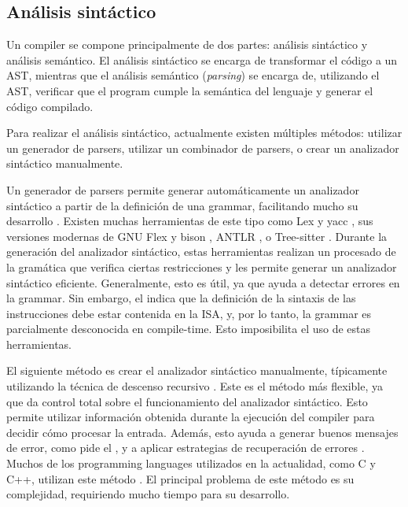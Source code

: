 \subsection{Análisis sintáctico}\label{subsec:parser}

Un \gls{compiler} se compone principalmente de dos partes: análisis sintáctico y
análisis semántico. El análisis sintáctico se encarga de transformar el código a
un \gls{AST}, mientras que el análisis semántico (\textit{parsing}) se encarga
de, utilizando el \gls{AST}, verificar que el \gls{program} cumple la semántica
del lenguaje y generar el código compilado. \parencite{dragon-book}

Para realizar el análisis sintáctico, actualmente existen múltiples métodos:
utilizar un generador de \glspl{parser}, utilizar un combinador de
\glspl{parser}, o crear un analizador sintáctico manualmente.
\parencite{dragon-book} \parencite{parser-combinators}

Un generador de \glspl{parser} permite generar automáticamente un analizador
sintáctico a partir de la definición de una \gls{grammar}, facilitando mucho su
desarrollo \parencite{dragon-book}. Existen muchas herramientas de este tipo
como Lex y yacc \parencite{yacc}, sus versiones modernas de GNU Flex y bison
\parencite{bison}, ANTLR \parencite{ANTLR}, o Tree-sitter
\parencite{tree-sitter}. Durante la generación del analizador sintáctico, estas
herramientas realizan un procesado de la gramática que verifica ciertas
restricciones y les permite generar un analizador sintáctico eficiente.
Generalmente, esto es útil, ya que ayuda a detectar errores en la \gls{grammar}.
Sin embargo, el  indica que la definición de la
sintaxis de las instrucciones debe estar contenida en la \gls{ISA}, y, por lo
tanto, la \gls{grammar} es parcialmente desconocida en \gls{compile-time}. Esto
imposibilita el uso de estas herramientas.

El siguiente método es crear el analizador sintáctico manualmente, típicamente
utilizando la técnica de descenso recursivo \parencite{dragon-book}. Este es el
método más flexible, ya que da control total sobre el funcionamiento del
analizador sintáctico. Esto permite utilizar información obtenida durante la
ejecución del \gls{compiler} para decidir cómo procesar la entrada. Además, esto
ayuda a generar buenos mensajes de error, como pide el
, y a aplicar estrategias de recuperación de errores
\parencite{errors-clang}. Muchos de los \glspl{programming language} utilizados
en la actualidad, como C y C++, utilizan este método
\parencite{parser-types-survey}. El principal problema de este método es su
complejidad, requiriendo mucho tiempo para su desarrollo.

